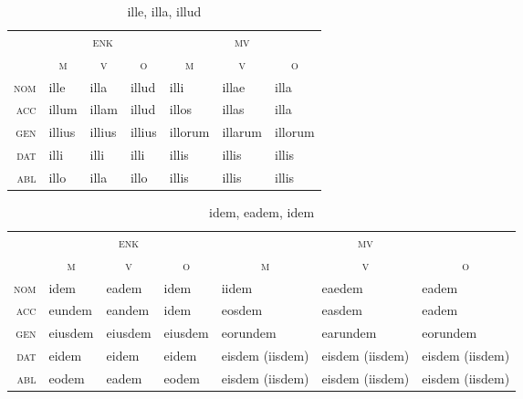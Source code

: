\documentclass[12pt,a4paper]{article}
\begin{document}
\begin{table}[H]
\centering
\begin{tabular}{ r | l l l | l l l }
\toprule
 & \multicolumn{3}{c|}{\textsc{enk}} & \multicolumn{3}{c}{\textsc{mv}} \\
 & \multicolumn{1}{c}{\textsc{m}} & \multicolumn{1}{c}{\textsc{v}} & \multicolumn{1}{c|}{\textsc{o}} & \multicolumn{1}{c}{\textsc{m}} & \multicolumn{1}{c}{\textsc{v}} & \multicolumn{1}{c}{\textsc{o}} \\ 
\midrule
\textsc{nom} & ille   & illa   & illud  & illi    & illae   & illa  \\
\textsc{acc} & illum  & illam  & illud  & illos   & illas   & illa  \\
\textsc{gen} & illius & illius & illius & illorum & illarum & illorum \\
\textsc{dat} & illi   & illi   & illi   & illis   & illis   & illis   \\
\textsc{abl} & illo   & illa   & illo   & illis   & illis   & illis   \\
\bottomrule
\end{tabular}
\caption{ille, illa, illud}
\label{tab:ille}
\end{table}

\begin{table}[H]
\centering
\begin{tabular}{ r | l l l | l l l }
\toprule
 & \multicolumn{3}{c|}{\textsc{enk}} & \multicolumn{3}{c}{\textsc{mv}} \\
 & \multicolumn{1}{c}{\textsc{m}} & \multicolumn{1}{c}{\textsc{v}} & \multicolumn{1}{c|}{\textsc{o}} & \multicolumn{1}{c}{\textsc{m}} & \multicolumn{1}{c}{\textsc{v}} & \multicolumn{1}{c}{\textsc{o}} \\ 
\midrule
\textsc{nom} & idem    & eadem   & idem    & iidem           & eaedem          & eadem  \\
\textsc{acc} & eundem  & eandem  & idem    & eosdem          & easdem          & eadem  \\
\textsc{gen} & eiusdem & eiusdem & eiusdem & eorundem        & earundem        & eorundem \\
\textsc{dat} & eidem   & eidem   & eidem   & eisdem (iisdem) & eisdem (iisdem) & eisdem (iisdem)   \\
\textsc{abl} & eodem   & eadem   & eodem   & eisdem (iisdem) & eisdem (iisdem) & eisdem (iisdem)   \\
\bottomrule
\end{tabular}
\caption{idem, eadem, idem}
\label{tab:idem}
\end{table}
\end{document}
